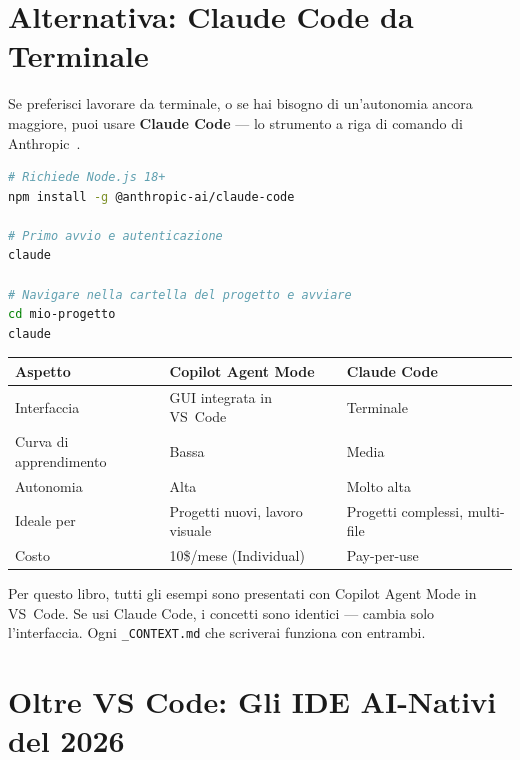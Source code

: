 \section{Alternativa: Claude Code da Terminale}

Se preferisci lavorare da terminale, o se hai bisogno di un'autonomia ancora maggiore, puoi usare \textbf{Claude Code} --- lo strumento a riga di comando di Anthropic~\cite{anthropic:claude-code}.

\begin{praticabox}[title={Pratica --- Installazione Claude Code}]
\begin{lstlisting}[language=bash]
# Richiede Node.js 18+
npm install -g @anthropic-ai/claude-code

# Primo avvio e autenticazione
claude

# Navigare nella cartella del progetto e avviare
cd mio-progetto
claude
\end{lstlisting}
\end{praticabox}

\begin{center}
\begin{tabularx}{\textwidth}{l X X}
\toprule
\textbf{Aspetto} & \textbf{Copilot Agent Mode} & \textbf{Claude Code} \\
\midrule
Interfaccia & GUI integrata in VS~Code & Terminale \\
Curva di apprendimento & Bassa & Media \\
Autonomia & Alta & Molto alta \\
Ideale per & Progetti nuovi, lavoro visuale & Progetti complessi, multi-file \\
Costo & 10\$/mese (Individual) & Pay-per-use \\
\bottomrule
\end{tabularx}
\end{center}

\begin{tipbox}
Per questo libro, tutti gli esempi sono presentati con Copilot Agent Mode in VS~Code. Se usi Claude Code, i concetti sono identici --- cambia solo l'interfaccia. Ogni \texttt{\_CONTEXT.md} che scriverai funziona con entrambi.
\end{tipbox}

\section{Oltre VS Code: Gli IDE AI-Nativi del 2026}

